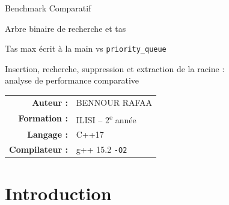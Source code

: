 \documentclass[12pt,a4paper]{report}
\begin{document}
\begin{titlepage}
  \centering
  \vspace*{2cm}
  {\huge Benchmark Comparatif\par}
  \vspace{0.4cm}
  {\LARGE Arbre binaire de recherche et tas\par}
  \vspace{0.3cm}
  {\Large Tas max écrit à la main vs \texttt{priority\_queue}\par}
  \vspace{1.3cm}
  {\large Insertion, recherche, suppression et extraction de la racine :\\[2pt]
  analyse de performance comparative\par}
  \vspace{1.3cm}
  \vspace{1.3cm}

  \begin{tabular}{r@{\quad}l}
    \textbf{Auteur :} & BENNOUR RAFAA \\
    \textbf{Formation :} & ILISI -- 2\textsuperscript{e} année \\
    \textbf{Langage :} & C++17 \\
    \textbf{Compilateur :} & g++ 15.2 \texttt{-O2} \\
  \end{tabular}
  \vfill
\end{titlepage}

\setcounter{tocdepth}{1}
\tableofcontents

\chapter{Introduction}
\end{document}
